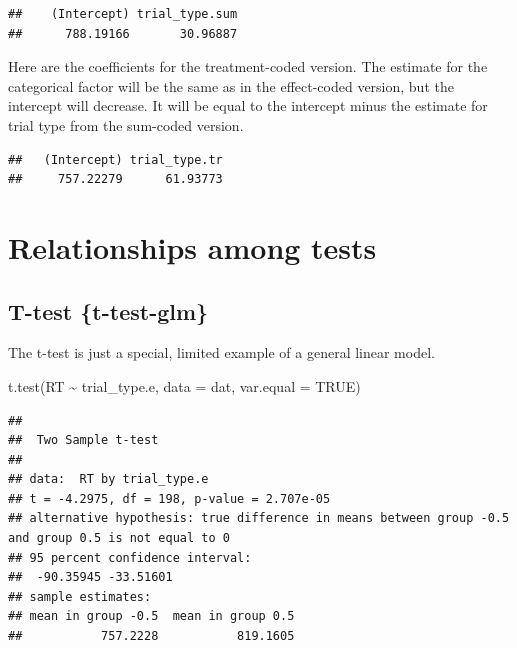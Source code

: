 \documentclass[
  oneside]{book}
\newenvironment{Shaded}{\begin{snugshade}}{\end{snugshade}}
\newcommand{\AttributeTok}[1]{\textcolor[rgb]{0.77,0.63,0.00}{#1}}
\newcommand{\ConstantTok}[1]{\textcolor[rgb]{0.00,0.00,0.00}{#1}}
\newcommand{\FunctionTok}[1]{\textcolor[rgb]{0.00,0.00,0.00}{#1}}
\newcommand{\NormalTok}[1]{#1}
\newcommand{\SpecialCharTok}[1]{\textcolor[rgb]{0.00,0.00,0.00}{#1}}
\begin{document}
\begin{verbatim}
##    (Intercept) trial_type.sum 
##      788.19166       30.96887
\end{verbatim}

Here are the coefficients for the treatment-coded version. The estimate for the categorical factor will be the same as in the effect-coded version, but the intercept will decrease. It will be equal to the intercept minus the estimate for trial type from the sum-coded version.

\begin{Shaded}
\end{Shaded}

\begin{verbatim}
##   (Intercept) trial_type.tr 
##     757.22279      61.93773
\end{verbatim}

\hypertarget{test-rels}{%
\section{Relationships among tests}\label{test-rels}}

\hypertarget{t-test-t-test-glm}{%
\subsection{T-test \{t-test-glm\}}\label{t-test-t-test-glm}}

The t-test is just a special, limited example of a general linear model.

\begin{Shaded}
\begin{Highlighting}[]
\FunctionTok{t.test}\NormalTok{(RT }\SpecialCharTok{\textasciitilde{}}\NormalTok{ trial\_type.e, }\AttributeTok{data =}\NormalTok{ dat, }\AttributeTok{var.equal =} \ConstantTok{TRUE}\NormalTok{)}
\end{Highlighting}
\end{Shaded}

\begin{verbatim}
## 
##  Two Sample t-test
## 
## data:  RT by trial_type.e
## t = -4.2975, df = 198, p-value = 2.707e-05
## alternative hypothesis: true difference in means between group -0.5 and group 0.5 is not equal to 0
## 95 percent confidence interval:
##  -90.35945 -33.51601
## sample estimates:
## mean in group -0.5  mean in group 0.5 
##           757.2228           819.1605
\end{verbatim}
\end{document}
